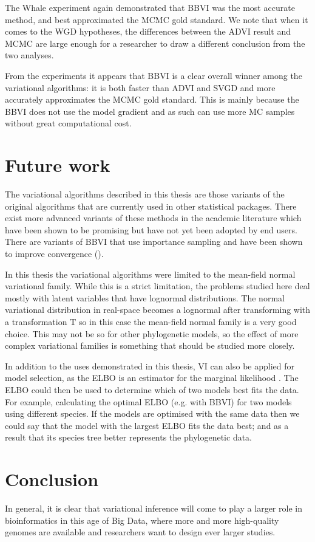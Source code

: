 \medskip

\par The Whale experiment again demonstrated that BBVI was the most accurate method, and best approximated the MCMC gold standard. We note that when it comes to the WGD hypotheses, the differences between the ADVI result and MCMC are large enough for a researcher to draw a different conclusion from the two analyses. 

\medskip

\par From the experiments it appears that BBVI is a clear overall winner among the variational algorithms: it is both faster than ADVI and SVGD and more accurately approximates the MCMC gold standard. This is mainly because the BBVI does not use the model gradient and as such can use more MC samples without great computational cost.

\section{Future work}
The variational algorithms described in this thesis are those variants of the original algorithms that are currently used in other statistical packages. There exist more advanced variants of these methods in the academic literature which have been shown to be promising but have not yet been adopted by end users. There are variants of BBVI that use importance sampling and have been shown to improve convergence (\cite{bbvi-advances}).
\medskip
\par In this thesis the variational algorithms were limited to the mean-field normal variational family. While this is a strict limitation, the problems studied here deal mostly with latent variables that have lognormal distributions. The normal variational distribution in real-space becomes a lognormal after transforming with a transformation $\mathrm{T}$ so in this case the mean-field normal family is a very good choice. This may not be so for other phylogenetic models, so the effect of more complex variational families is something that should be studied more closely. 
\medskip
\par In addition to the uses demonstrated in this thesis, VI can also be applied for model selection, as the ELBO is an estimator for the marginal likelihood \cite{19}. The ELBO could then be used to determine which of two models best fits the data. For example, calculating the optimal ELBO (e.g. with BBVI) for two
models using different species. If the models are optimised with the same data then we could say that the model with the largest ELBO fits the data best; and as a result that its species tree better represents the phylogenetic data.

\section{Conclusion}
\par In general, it is clear that variational inference will come to play a larger role in bioinformatics in this age of Big Data, where more and more high-quality genomes are available and researchers want to design ever larger studies. 